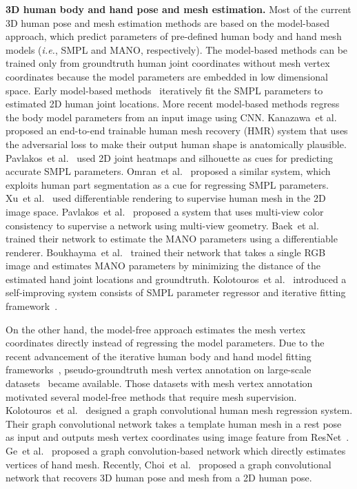 \documentclass[runningheads]{llncs}
\begin{document}
\noindent \textbf{3D human body and hand pose and mesh estimation.}
Most of the current 3D human pose and mesh estimation methods are based on the model-based approach, which predict parameters of pre-defined human body and hand mesh models (\textit{i.e.}, SMPL and MANO, respectively).
The model-based methods can be trained only from groundtruth human joint coordinates without mesh vertex coordinates because the model parameters are embedded in low dimensional space.
Early model-based methods~\cite{bogo2016keep} iteratively fit the SMPL parameters to estimated 2D human joint locations. 
More recent model-based methods regress the body model parameters from an input image using CNN. 
Kanazawa~et al.~\cite{kanazawa2018end} proposed an end-to-end trainable human mesh recovery (HMR) system that uses the adversarial loss to make their output human shape is anatomically plausible. 
Pavlakos~et al.~\cite{pavlakos2018learning} used 2D joint heatmaps and silhouette as cues for predicting accurate SMPL parameters. 
Omran~et al.~\cite{omran2018neural} proposed a similar system, which exploits human part segmentation as a cue for regressing SMPL parameters. 
Xu~et al.~\cite{xu2019denserac} used differentiable rendering to supervise human mesh in the 2D image space. 
Pavlakos~et al.~\cite{pavlakos2019texturepose} proposed a system that uses multi-view color consistency to supervise a network using multi-view geometry. 
Baek~et al.~\cite{baek2019pushing} trained their network to estimate the MANO parameters using a differentiable renderer. 
Boukhayma~et al.~\cite{boukhayma20193d} trained their network that takes a single RGB image and estimates MANO parameters by minimizing the distance of the estimated hand joint locations and groundtruth.
Kolotouros~et al.~\cite{kolotouros2019learning} introduced a self-improving system consists of SMPL parameter regressor and iterative fitting framework~\cite{bogo2016keep}. 


On the other hand, the model-free approach estimates the mesh vertex coordinates directly instead of regressing the model parameters. 
Due to the recent advancement of the iterative human body and hand model fitting frameworks~\cite{bogo2016keep,pavlakos2019expressive,Freihand2019}, pseudo-groundtruth mesh vertex annotation on large-scale datasets~\cite{ionescu2014human3,lin2014microsoft,Freihand2019,von2018recovering} became available.
Those datasets with mesh vertex annotation motivated several model-free methods that require mesh supervision.
Kolotouros~et al.~\cite{kolotouros2019convolutional} designed a graph convolutional human mesh regression system.
Their graph convolutional network takes a template human mesh in a rest pose as input and outputs mesh vertex coordinates using image feature from ResNet~\cite{he2016deep}.
Ge~et al.~\cite{ge20193d} proposed a graph convolution-based network which directly estimates vertices of hand mesh.
Recently, Choi~et al.~\cite{choi2020p2m} proposed a graph convolutional network that recovers 3D human pose and mesh from a 2D human pose.
\end{document}
